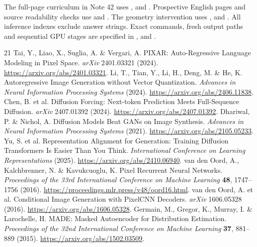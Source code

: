 \documentclass[10pt,a4paper]{article}
\begin{document}
The full-page curriculum in Note 42 uses
,
 and
. Prospective English pages and
source readability checks use 
and . The geometry intervention
uses ,
 and
. All inference indexes exclude
answer strings. Exact commands, fresh output paths and sequential GPU stages
are specified in ,
 and
.

\begin{thebibliography}{21}
\small
{}
 Tai, Y., Liao, X., Suglia, A. \& Vergari, A. PIXAR: Auto-Regressive Language Modeling in Pixel Space. \emph{arXiv} 2401.03321 (2024). \url{https://arxiv.org/abs/2401.03321}.
 Li, T., Tian, Y., Li, H., Deng, M. \& He, K. Autoregressive Image Generation without Vector Quantization. \emph{Advances in Neural Information Processing Systems} (2024). \url{https://arxiv.org/abs/2406.11838}.
 Chen, B. et al. Diffusion Forcing: Next-token Prediction Meets Full-Sequence Diffusion. \emph{arXiv} 2407.01392 (2024). \url{https://arxiv.org/abs/2407.01392}.
 Dhariwal, P. \& Nichol, A. Diffusion Models Beat GANs on Image Synthesis. \emph{Advances in Neural Information Processing Systems} (2021). \url{https://arxiv.org/abs/2105.05233}.
 Yu, S. et al. Representation Alignment for Generation: Training Diffusion Transformers Is Easier Than You Think. \emph{International Conference on Learning Representations} (2025). \url{https://arxiv.org/abs/2410.06940}.
 van den Oord, A., Kalchbrenner, N. \& Kavukcuoglu, K. Pixel Recurrent Neural Networks. \emph{Proceedings of the 33rd International Conference on Machine Learning} \textbf{48}, 1747--1756 (2016). \url{https://proceedings.mlr.press/v48/oord16.html}.
 van den Oord, A. et al. Conditional Image Generation with PixelCNN Decoders. \emph{arXiv} 1606.05328 (2016). \url{https://arxiv.org/abs/1606.05328}.
 Germain, M., Gregor, K., Murray, I. \& Larochelle, H. MADE: Masked Autoencoder for Distribution Estimation. \emph{Proceedings of the 32nd International Conference on Machine Learning} \textbf{37}, 881--889 (2015). \url{https://arxiv.org/abs/1502.03509}.

\end{thebibliography}
\end{document}
